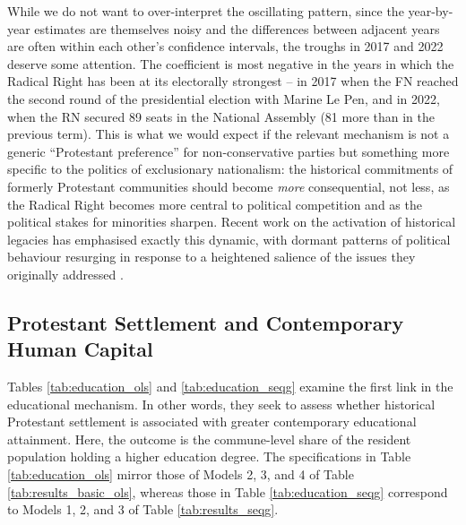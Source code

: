 \documentclass[12pt]{article}
\begin{document}
While we do not want to over-interpret the oscillating pattern, since the year-by-year estimates are themselves noisy and the differences between adjacent years are often within each other's confidence intervals, the troughs in 2017 and 2022 deserve some attention. The coefficient is most negative in the years in which the Radical Right has been at its electorally strongest -- in 2017 when the FN reached the second round of the presidential election with Marine Le Pen, and in 2022, when the RN secured 89 seats in the National Assembly (81 more than in the previous term). This is what we would expect if the relevant mechanism is not a generic ``Protestant preference'' for non-conservative parties but something more specific to the politics of exclusionary nationalism: the historical commitments of formerly Protestant communities should become \textit{more} consequential, not less, as the Radical Right becomes more central to political competition and as the political stakes for minorities sharpen. Recent work on the activation of historical legacies has emphasised exactly this dynamic, with dormant patterns of political behaviour resurging in response to a heightened salience of the issues they originally addressed \parencite{wittenbergCruciblesPoliticalLoyalty2006, dinasInterruptedContinuitiesLocal2024, ochsnerActivatedHistoryCase2024, foukaCollectiveRemembrancePrivate2023}.

\subsection{Protestant Settlement and Contemporary Human Capital}

Tables \ref{tab:education_ols} and \ref{tab:education_seqg} examine the first link in the educational mechanism. In other words, they seek to assess whether historical Protestant settlement is associated with greater contemporary educational attainment. Here, the outcome is the commune-level share of the resident population holding a higher education degree. The specifications in Table \ref{tab:education_ols} mirror those of Models 2, 3, and 4 of Table \ref{tab:results_basic_ols}, whereas those in Table \ref{tab:education_seqg} correspond to Models 1, 2, and 3 of Table \ref{tab:results_seqg}.
\end{document}
